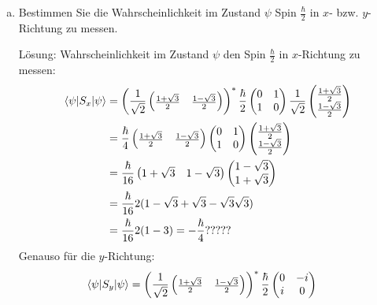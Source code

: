 \documentclass{scrartcl}
\begin{document}
\begin{enumerate}[a)]
\item Bestimmen Sie die Wahrscheinlichkeit im Zustand $\psi$ Spin $\frac{\hbar}{2}$ in $x$- bzw. $y$-Richtung zu messen.
\item[Lösung:]
Wahrscheinlichkeit im Zustand $\psi$ den Spin $\frac\hbar 2$ in $x$-Richtung zu messen:
\begin{align*}
\braket{\psi|S_x|\psi}	
	&= 
	\left(\frac 1{\sqrt 2} \begin{pmatrix}\frac{1+\sqrt 3}{2} & \frac{1-\sqrt 3}{2}\end{pmatrix}\right)^\ast
	\frac \hbar 2 \begin{pmatrix} 0&1\\1&0 \end{pmatrix}
	\frac 1{\sqrt 2}\begin{pmatrix}\frac{1+\sqrt 3}{2}\\\frac{1-\sqrt 3}{2}\end{pmatrix}\\
	&= 	
	\frac \hbar 4 \begin{pmatrix}\frac{1+\sqrt 3}{2} & \frac{1-\sqrt 3}{2}\end{pmatrix}
	\begin{pmatrix} 0&1\\1&0 \end{pmatrix}
	\begin{pmatrix}\frac{1+\sqrt 3}{2}\\\frac{1-\sqrt 3}{2}\end{pmatrix}\\
	&=
	\frac \hbar {16} \begin{pmatrix}1+\sqrt 3 & 1-\sqrt 3\end{pmatrix}
	\begin{pmatrix}1-\sqrt 3\\1+\sqrt 3\end{pmatrix}\\
	&=
	\frac \hbar {16} 2 (1 -\sqrt 3 +\sqrt 3 -\sqrt 3 \sqrt 3)\\ 
	&=
	\frac \hbar {16} 2 (1 - 3) = -\frac \hbar 4		?????
\end{align*}
Genauso für die $y$-Richtung:
\begin{align*}
\braket{\psi|S_y|\psi}	
	&= 
	\left(\frac 1{\sqrt 2} \begin{pmatrix}\frac{1+\sqrt 3}{2} & \frac{1-\sqrt 3}{2}\end{pmatrix}\right)^\ast
	\frac \hbar 2 \begin{pmatrix} 0&-i\\i&0 \end{pmatrix}

\end{align*}
\end{enumerate}
\end{document}
